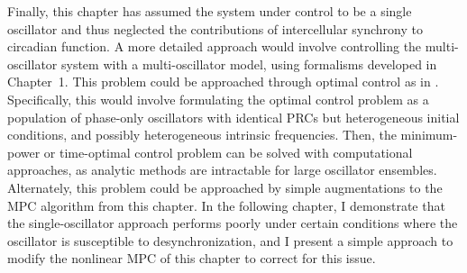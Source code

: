 Finally, this chapter has assumed the system under control to be a single oscillator and thus neglected the contributions of intercellular synchrony to circadian function.
A more detailed approach would involve controlling the multi-oscillator system with a multi-oscillator model, using formalisms developed in Chapter~1.
This problem could be approached through optimal control as in \cite{Li2013}.
Specifically, this would involve formulating the optimal control problem as a population of phase-only oscillators with identical PRCs but heterogeneous initial conditions, and possibly heterogeneous intrinsic frequencies.
Then, the minimum-power or time-optimal control problem can be solved with computational approaches, as analytic methods are intractable for large oscillator ensembles.
Alternately, this problem could be approached by simple augmentations to the MPC algorithm from this chapter.
In the following chapter, I demonstrate that the single-oscillator approach performs poorly under certain conditions where the oscillator is susceptible to desynchronization, and I present a simple approach to modify the nonlinear MPC of this chapter to correct for this issue.























